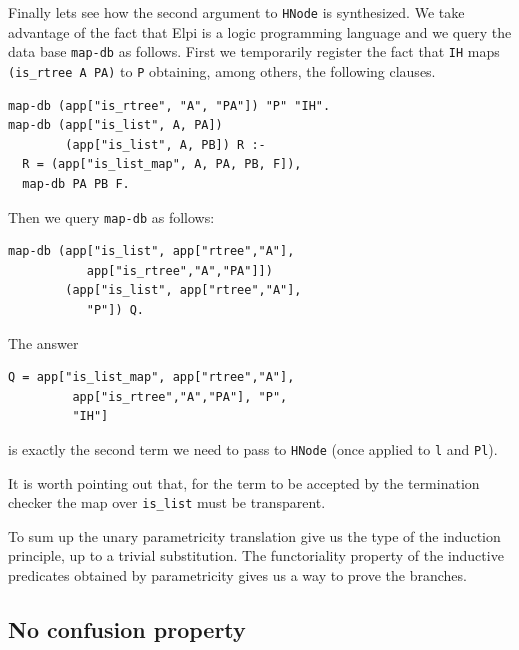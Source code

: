 \documentclass[sigplan,10pt,review]{acmart}\settopmatter{printfolios=true,printccs=false,printacmref=false}
\begin{document}
Finally lets see  how the second argument to \lstinline+HNode+ is
synthesized.  We take advantage of the fact that Elpi is a logic
programming language and we query the data base \lstinline+map-db+
as follows. First we temporarily register 
the fact that \lstinline+IH+ maps
\lstinline+(is_rtree A PA)+ to \lstinline+P+ obtaining, among others,
the following clauses.

\begin{minipage}{\textwidth}\begin{lstlisting}[]
map-db (app["is_rtree", "A", "PA"]) "P" "IH".
map-db (app["is_list", A, PA])
        (app["is_list", A, PB]) R :-
  R = (app["is_list_map", A, PA, PB, F]),
  map-db PA PB F.
\end{lstlisting}\end{minipage}

Then we query \lstinline+map-db+ as follows:

\begin{minipage}{\textwidth}\begin{lstlisting}[]
map-db (app["is_list", app["rtree","A"],
           app["is_rtree","A","PA"]])
        (app["is_list", app["rtree","A"],
           "P"]) Q.
\end{lstlisting}\end{minipage}

\noindent
The answer

\begin{minipage}{\textwidth}\begin{lstlisting}[]
Q = app["is_list_map", app["rtree","A"],
         app["is_rtree","A","PA"], "P",
         "IH"]
\end{lstlisting}\end{minipage}

\noindent
is exactly the second term we need to pass to \lstinline+HNode+
(once applied to \lstinline+l+ and \lstinline+Pl+).

It is worth pointing out that, for the term to be accepted
by the termination checker the map over \lstinline+is_list+
must be transparent.

To sum up the unary parametricity translation give us the type
of the induction principle, up to a trivial substitution.
The functoriality property of the inductive predicates obtained by
parametricity gives us a way to prove the branches.

\subsection{No confusion property} %
\end{document}
